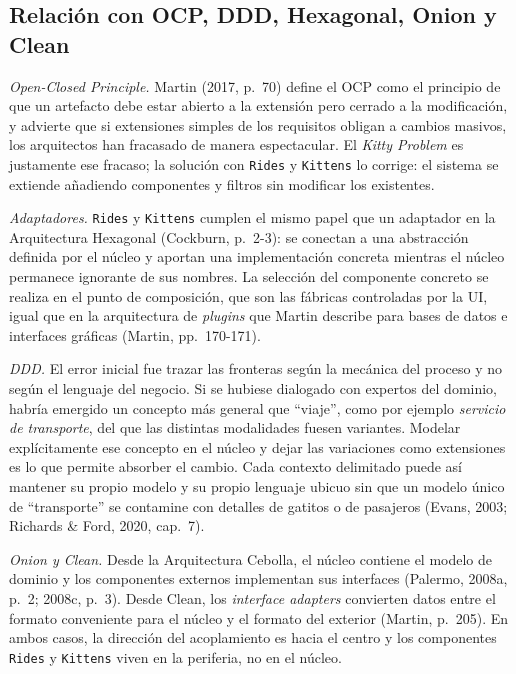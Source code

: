 \documentclass[12pt,a4paper]{article}
\begin{document}
\subsection{Relación con OCP, DDD, Hexagonal, Onion y Clean}

\emph{Open-Closed Principle.} Martin (2017, p.~70) define el OCP como el principio de que un artefacto debe estar abierto a la extensión pero cerrado a la modificación, y advierte que si extensiones simples de los requisitos obligan a cambios masivos, los arquitectos han fracasado de manera espectacular. El \emph{Kitty Problem} es justamente ese fracaso; la solución con \texttt{Rides} y \texttt{Kittens} lo corrige: el sistema se extiende añadiendo componentes y filtros sin modificar los existentes.

\emph{Adaptadores.} \texttt{Rides} y \texttt{Kittens} cumplen el mismo papel que un adaptador en la Arquitectura Hexagonal (Cockburn, p.~2-3): se conectan a una abstracción definida por el núcleo y aportan una implementación concreta mientras el núcleo permanece ignorante de sus nombres. La selección del componente concreto se realiza en el punto de composición, que son las fábricas controladas por la UI, igual que en la arquitectura de \emph{plugins} que Martin describe para bases de datos e interfaces gráficas (Martin, pp.~170-171).

\emph{DDD.} El error inicial fue trazar las fronteras según la mecánica del proceso y no según el lenguaje del negocio. Si se hubiese dialogado con expertos del dominio, habría emergido un concepto más general que ``viaje'', como por ejemplo \emph{servicio de transporte}, del que las distintas modalidades fuesen variantes. Modelar explícitamente ese concepto en el núcleo y dejar las variaciones como extensiones es lo que permite absorber el cambio. Cada contexto delimitado puede así mantener su propio modelo y su propio lenguaje ubicuo sin que un modelo único de ``transporte'' se contamine con detalles de gatitos o de pasajeros (Evans, 2003; Richards \& Ford, 2020, cap.~7).

\emph{Onion y Clean.} Desde la Arquitectura Cebolla, el núcleo contiene el modelo de dominio y los componentes externos implementan sus interfaces (Palermo, 2008a, p.~2; 2008c, p.~3). Desde Clean, los \emph{interface adapters} convierten datos entre el formato conveniente para el núcleo y el formato del exterior (Martin, p.~205). En ambos casos, la dirección del acoplamiento es hacia el centro y los componentes \texttt{Rides} y \texttt{Kittens} viven en la periferia, no en el núcleo.
\end{document}
